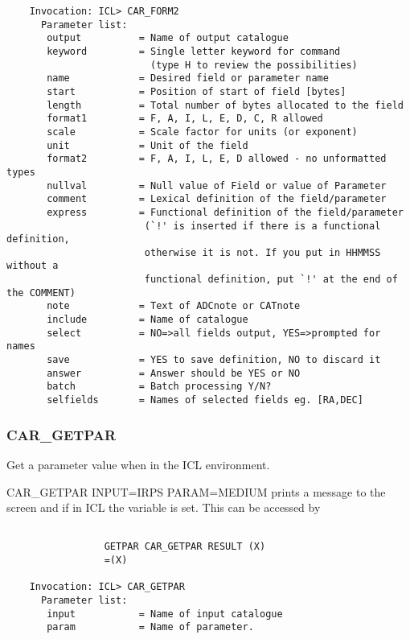 \begin{verbatim}
    Invocation: ICL> CAR_FORM2
      Parameter list:
       output          = Name of output catalogue
       keyword         = Single letter keyword for command
                         (type H to review the possibilities)
       name            = Desired field or parameter name
       start           = Position of start of field [bytes]
       length          = Total number of bytes allocated to the field
       format1         = F, A, I, L, E, D, C, R allowed
       scale           = Scale factor for units (or exponent)
       unit            = Unit of the field
       format2         = F, A, I, L, E, D allowed - no unformatted types
       nullval         = Null value of Field or value of Parameter
       comment         = Lexical definition of the field/parameter
       express         = Functional definition of the field/parameter
                        (`!' is inserted if there is a functional definition, 
                        otherwise it is not. If you put in HHMMSS without a 
                        functional definition, put `!' at the end of the COMMENT)
       note            = Text of ADCnote or CATnote
       include         = Name of catalogue
       select          = NO=>all fields output, YES=>prompted for names
       save            = YES to save definition, NO to discard it
       answer          = Answer should be YES or NO
       batch           = Batch processing Y/N?
       selfields       = Names of selected fields eg. [RA,DEC]
\end{verbatim}
 
\subsubsection{CAR\_GETPAR}

Get a parameter value when in the ICL environment.

CAR\_GETPAR INPUT=IRPS PARAM=MEDIUM prints a message to the screen and if in ICL
the variable is set. This can be accessed by

\begin{verbatim}
 
                 GETPAR CAR_GETPAR RESULT (X)
                 =(X)

    Invocation: ICL> CAR_GETPAR
      Parameter list:
       input           = Name of input catalogue
       param           = Name of parameter.

\end{verbatim}

